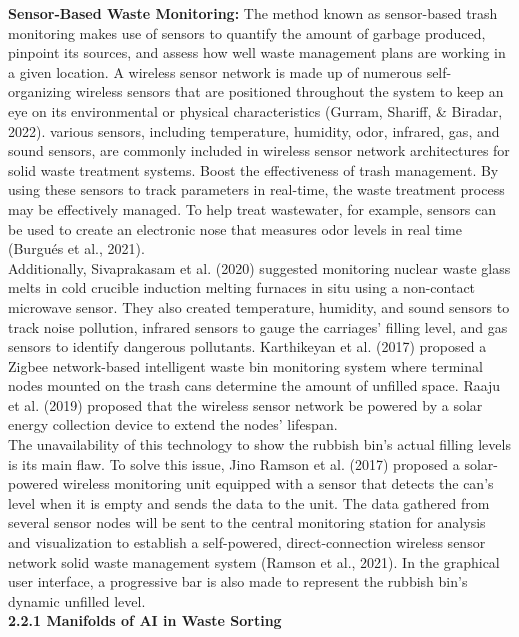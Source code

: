 \documentclass[a4paper,11pt,onecolumn]{article}
\begin{document}
\textbf{Sensor‑Based Waste Monitoring:} The method known as sensor-based trash monitoring makes use of sensors to quantify the amount of garbage produced, pinpoint its sources, and assess how well waste management plans are working in a given location. A wireless sensor network is made up of numerous self-organizing wireless sensors that are positioned throughout the system to keep an eye on its environmental or physical characteristics (Gurram, Shariff, & Biradar, 2022).  various sensors, including temperature, humidity, odor, infrared, gas, and sound sensors, are commonly included in wireless sensor network architectures for solid waste treatment systems. Boost the effectiveness of trash management. By using these sensors to track parameters in real-time, the waste treatment process may be effectively managed. To help treat wastewater, for example, sensors can be used to create an electronic nose that measures odor levels in real time (Burgués et al., 2021). \\
Additionally, Sivaprakasam et al. (2020) suggested monitoring nuclear waste glass melts in cold crucible induction melting furnaces in situ using a non-contact microwave sensor. They also created temperature, humidity, and sound sensors to track noise pollution, infrared sensors to gauge the carriages' filling level, and gas sensors to identify dangerous pollutants. Karthikeyan et al. (2017) proposed a Zigbee network-based intelligent waste bin monitoring system where terminal nodes mounted on the trash cans determine the amount of unfilled space. Raaju et al. (2019) proposed that the wireless sensor network be powered by a solar energy collection device to extend the nodes' lifespan.\\
The unavailability of this technology to show the rubbish bin's actual filling levels is its main flaw. To solve this issue, Jino Ramson et al. (2017) proposed a solar-powered wireless monitoring unit equipped with a sensor that detects the can's level when it is empty and sends the data to the unit. The data gathered from several sensor nodes will be sent to the central monitoring station for analysis and visualization to establish a self-powered, direct-connection wireless sensor network solid waste management system (Ramson et al., 2021). In the graphical user interface, a progressive bar is also made to represent the rubbish bin's dynamic unfilled level.\newline \\
\textbf{2.2.1 Manifolds of AI in Waste Sorting} \\
\end{document}
